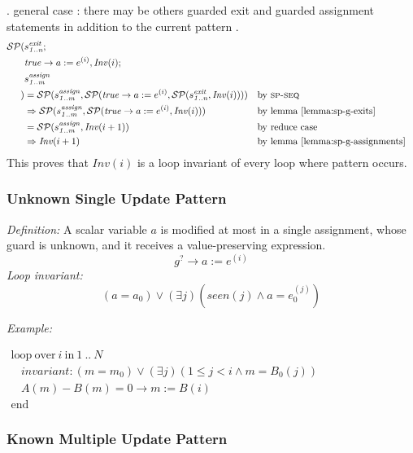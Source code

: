 \documentclass[a4paper,10pt]{article}
\newcommand{\idx}{\ensuremath{i}\xspace}
\newcommand{\at}[1]{{(#1)}}
\newcommand{\KWloop}{\ensuremath{\mathrm{loop}~}}
\newcommand{\KWend}{\ensuremath{\mathrm{end}~}}
\newcommand{\KWover}{\ensuremath{\mathrm{over}~}}
\newcommand{\KWin}{\ensuremath{~\mathrm{in}~}}
\newcommand{\seen}[1]{\ensuremath{\mathit{seen}(#1)}\xspace}
\newcommand{\loopinvariant}{\noindent\textit{Loop invariant:}\xspace}
\newcommand{\patterndef}{\noindent\textit{Definition:}\xspace}
\newcommand{\patternexample}{\noindent\textit{Example:}\xspace}
\newcommand{\Inv}[1]{\ensuremath{\mathit{Inv}(#1)\xspace}}
\newcommand{\gstatement}[2]{\ensuremath{s^{\mathit{#1}}_{\mathit{#2}}\xspace}}
\newcommand{\spseq}{\textsc{sp-seq}\xspace}
\newenvironment{proof}[1][Proof.]{\begin{trivlist}
\item[\hskip \labelsep {\bfseries #1}]}{\end{trivlist}}
\begin{document}
\begin{proof}
. general case : there may be others guarded exit and guarded assignment statements
                  in addition to the current pattern \curpattern.\\
  \begin{align*}
    \spost{
      &\gstatement{exit}{1..n};\\
      &\mathit{true} \rightarrow a := e^\at{\idx}}{\Inv{\idx};\\
      &\gstatement{assign}{1..m}\\
    }
    &= \spost{\gstatement{assign}{1..m}}{\spost{\mathit{true} \rightarrow a := e^\at{\idx}}
        {\spost{\gstatement{exit}{1..n}}{\Inv{\idx}}}} && \text{by \spseq} \\ 
    &\Rightarrow \spost{\gstatement{assign}{1..m}}
        {\spost{\mathit{true} \rightarrow a := e^\at{\idx}}{\Inv{\idx}}} && \text{by lemma \ref{lemma:sp-g-exits}} \\ 
    &= \spost{\gstatement{assign}{1..m}}{\Inv{\idx+1}} && \text{by reduce case} \\ 
    &\Rightarrow \Inv{\idx+1} && \text{by lemma \ref{lemma:sp-g-assignments}}
  \end{align*}
  This proves that \Inv{\idx} is a loop invariant of every loop where pattern
  \curpattern occurs.
\end{proof}

\subsubsection*{Unknown Single Update Pattern}

\patterndef A scalar variable $a$ is modified at most in a single assignment, whose
guard is unknown, and it receives a value-preserving expression.
%
$$g^? \rightarrow a := e^\at{\idx}$$
%
\loopinvariant
%
$$(a = a_0) \lor (\exists j)(\seen{j} \land a = e_0^\at{j})$$

\bigskip
\patternexample

\medskip
$\begin{array}{l}
  \KWloop \KWover i \KWin 1~..~N \\
  ~~~~ \textit{invariant}: (m = m_0) \lor (\exists j)(1\leq j < i \land m = B_0(j))\\
  ~~~~ A(m)-B(m)=0 \rightarrow m := B(i)\\
  \KWend
\end{array}$

\subsubsection*{Known Multiple Update Pattern}
\end{document}
